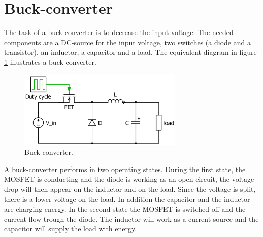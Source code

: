 \section{Buck-converter\label{Buck-C}}

The task of a buck converter is to decrease the input voltage. The needed components are a DC-source for the input voltage, two switches (a diode and a transistor), an inductor, a capacitor and a load. The equivalent diagram in figure \ref{Buck-converter} illustrates a buck-converter. 

\begin{figure}[htbp]
	\begin{center}
		\includegraphics[width=0.7\textwidth]{../Pictures/Buck-converter}
		\caption{Buck-converter.}
		\label{Buck-converter}
	\end{center}	
\end{figure}

A buck-converter performs in two operating states. 
During the first state, the MOSFET is conducting and the diode is working as an open-circuit, the voltage drop will then appear on the inductor and on the load. Since the voltage is split, there is a lower voltage on the load. In addition the capacitor and the inductor are charging energy. In the second state the MOSFET is switched off and the current flow trough the diode. The inductor will work as a current source and %
the capacitor will supply the load with energy.

